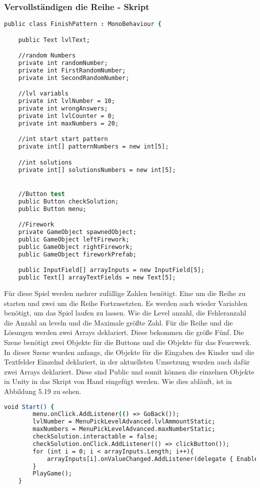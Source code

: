 \subsubsection{Vervollständigen die Reihe - Skript}
\begin{lstlisting}[language=csh, caption={hideCircle.cs Variablen Deklaration}]
public class FinishPattern : MonoBehaviour {

	public Text lvlText;

	//random Numbers
	private int randomNumber;
	private int FirstRandomNumber;
	private int SecondRandomNumber;

	//lvl variabls
	private int lvlNumber = 10;
	private int wrongAnswers;
	private int lvlCounter = 0;
	private int maxNumbers = 20;

	//int start start pattern
	private int[] patternNumbers = new int[5];

	//int solutions
	private int[] solutionsNumbers = new int[5];


	//Button test
	public Button checkSolution;
	public Button menu;

	//Firework
	private GameObject spawnedObject;
	public GameObject leftFirework;
	public GameObject rightFirework;
	public GameObject fireworkPrefab;

	public InputField[] arrayInputs = new InputField[5];
	public Text[] arrayTextFields = new Text[5];
\end{lstlisting}
Für diese Spiel werden mehrer zufällige Zahlen benötigt. Eine um die Reihe zu starten und zwei um die Reihe Fortzusetzten.  Es werden auch wieder Variablen benötigt, um das Spiel laufen zu lassen. Wie die Level anzahl, die Fehleranzahl die Anzahl an leveln und die Maximale größte Zahl. Für die Reihe und die Lösungen werden zwei Arrays deklariert. Diese bekommen die größe Fünf. Die Szene benötigt zwei Objekte für die Buttons und die Objekte für das Feuerwerk. In dieser Szene wurden anfangs, die Objekte für die Eingaben des Kinder und die Textfelder Einzelnd deklariert, in der aktuellsten Umsetzung wurden auch dafür zwei Arrays deklariert. Diese sind Public und somit können die einzelnen Objekte in Unity in das Skript von Hand eingefügt werden. Wie dies abläuft, ist in Abbildung 5.19 zu sehen.\\
\begin{lstlisting}[language=csh, caption={hideCircle.cs Start-Funktion}]
	void Start() {
		menu.onClick.AddListener(() => GoBack());
		lvlNumber = MenuPickLevelAdvanced.lvlAmmountStatic;
		maxNumbers = MenuPickLevelAdvanced.maxNumberStatic;
		checkSolution.interactable = false;
		checkSolution.onClick.AddListener(() => clickButton());
		for (int i = 0; i < arrayInputs.Length; i++){
			arrayInputs[i].onValueChanged.AddListener(delegate { EnableButton(); });
		}
		PlayGame();
	}
\end{lstlisting}
